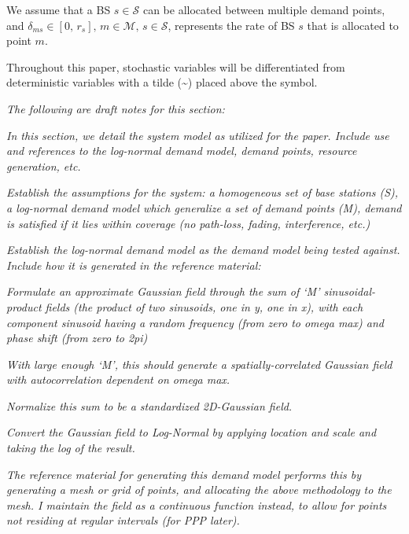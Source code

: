 \documentclass[onecolumn,draftcls]{IEEEtran}
\begin{document}

We assume that a BS $s \in \mathcal{S}$ can be allocated between multiple demand points, and $\delta_{ms} \in [0,\, r_s],\, m \in \mathcal{M},\, s \in \mathcal{S}$, represents the rate of BS $s$ that is allocated to point $m$.

Throughout this paper, stochastic variables will be differentiated from deterministic variables with a tilde (\textasciitilde) placed above the symbol.

\iffalse
\noindent {\color{red} \rule{\linewidth}{0.5mm}}

\textit{The following are draft notes for this section:}

\textit{In this section, we detail the system model as utilized for the paper.  Include use and references to the log-normal demand model, demand points, resource generation, etc.}

\textit{Establish the assumptions for the system: a homogeneous set of base stations (S), a log-normal demand model which generalize a set of demand points (M), demand is satisfied if it lies within coverage (no path-loss, fading, interference, etc.)}

\textit{Establish the log-normal demand model as the demand model being tested against.  Include how it is generated in the reference material:}

\textit{Formulate an approximate Gaussian field through the sum of `M' sinusoidal-product fields (the product of two sinusoids, one in y, one in x), with each component sinusoid having a random frequency (from zero to omega max) and phase shift (from zero to 2pi)}
		
\textit{With large enough `M', this should generate a spatially-correlated Gaussian field with autocorrelation dependent on omega max.}
		
\textit{Normalize this sum to be a standardized 2D-Gaussian field.}
		
\textit{Convert the Gaussian field to Log-Normal by applying location and scale and taking the log of the result.}
		
\textit{The reference material for generating this demand model performs this by generating a mesh or grid of points, and allocating the above methodology to the mesh.  I maintain the field as a continuous function instead, to allow for points not residing at regular intervals (for PPP later).}
\end{document}
